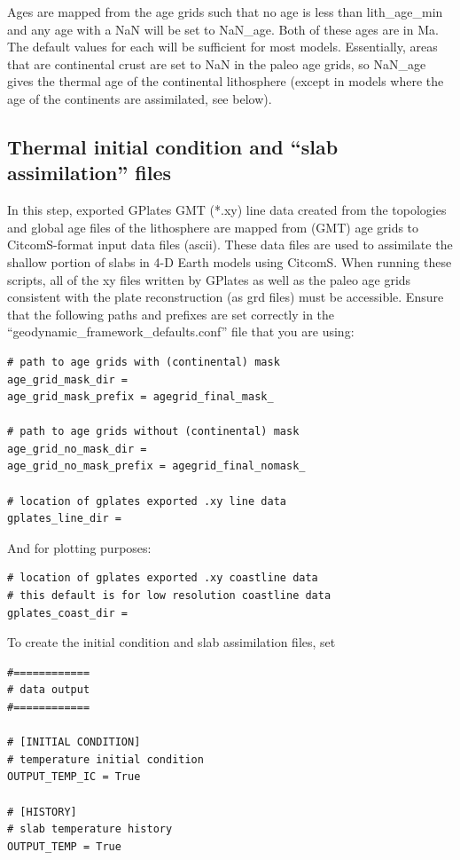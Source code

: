 \documentclass[letterpaper,12pt]{article}
\begin{document}
Ages are mapped from the age grids such that no age is less than lith\_age\_min and any age with a NaN will be set to NaN\_age.
Both of these ages are in Ma. The default values for each will be sufficient for most models.
Essentially, areas that are continental crust are set to NaN in the paleo age grids, so NaN\_age gives the thermal age of the continental lithosphere (except in models where the age of the continents are assimilated, see below).

\subsection{Thermal initial condition and ``slab assimilation'' files}

In this step, exported GPlates GMT (*.xy) line data created from the topologies and global age files of the lithosphere are mapped from (GMT) age grids to CitcomS-format input data files (ascii).  These data files are used to assimilate the shallow portion of slabs in 4-D Earth models using CitcomS.  When running these scripts, all of the xy files written by GPlates as well as the paleo age grids consistent with the plate reconstruction (as grd files) must be accessible.   Ensure that the following paths and prefixes are set correctly in the ``geodynamic\_framework\_defaults.conf'' file that you are using:

\begin{verbatim}
# path to age grids with (continental) mask
age_grid_mask_dir =
age_grid_mask_prefix = agegrid_final_mask_

# path to age grids without (continental) mask
age_grid_no_mask_dir =
age_grid_no_mask_prefix = agegrid_final_nomask_

# location of gplates exported .xy line data
gplates_line_dir =
\end{verbatim}

And for plotting purposes:

\begin{verbatim}
# location of gplates exported .xy coastline data
# this default is for low resolution coastline data
gplates_coast_dir =
\end{verbatim}

To create the initial condition and slab assimilation files, set 

\begin{verbatim}
#============
# data output
#============

# [INITIAL CONDITION]
# temperature initial condition
OUTPUT_TEMP_IC = True

# [HISTORY]
# slab temperature history
OUTPUT_TEMP = True
\end{verbatim}
\end{document}
